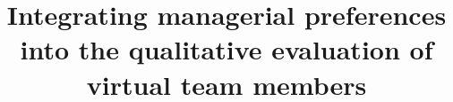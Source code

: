 \documentclass{misqdoc} %
\begin{document}








\title{Integrating managerial preferences into the qualitative evaluation of virtual team members}


\doublespacing
\end{document}
